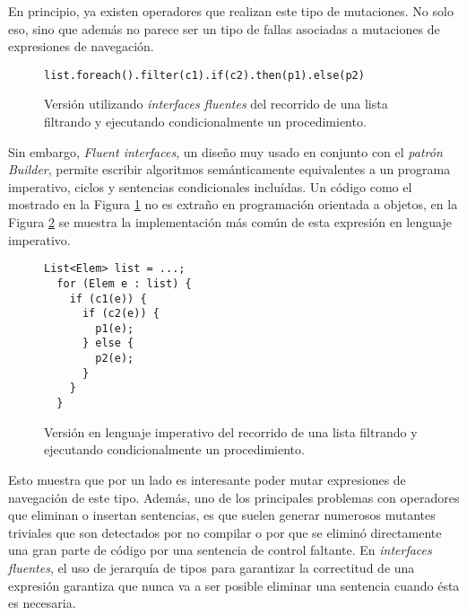 En principio, ya existen operadores que realizan este tipo de mutaciones. No solo eso, sino que adem\'as no parece ser un tipo de fallas asociadas a mutaciones de expresiones de navegaci\'on.

\begin{figure}
	\begin{lstlisting}[frame=single, mathescape=true,framexleftmargin=1.5em]
  list.foreach().filter(c1).if(c2).then(p1).else(p2)
	\end{lstlisting}
	\caption{Versi\'on utilizando \emph{interfaces fluentes} del recorrido de una lista filtrando y ejecutando condicionalmente un procedimiento.}
	\label{figures.examples.fluent.example1.fluent}
\end{figure}

Sin embargo, \emph{Fluent interfaces}, un dise\~no muy usado en conjunto con el \emph{patr\'on Builder}, permite escribir algoritmos sem\'anticamente equivalentes a un programa imperativo, ciclos y sentencias condicionales inclu\'idas. Un c\'odigo como el mostrado en la Figura \ref{figures.examples.fluent.example1.fluent} no es extra\~no en programaci\'on orientada a objetos, en la Figura \ref{figures.examples.fluent.example1.imperative} se muestra la implementaci\'on m\'as com\'un de esta expresi\'on en lenguaje imperativo.

\begin{figure}
	\begin{lstlisting}[frame=single, mathescape=true,framexleftmargin=1.5em]
  List<Elem> list = ...;
  for (Elem e : list) {
    if (c1(e)) {
      if (c2(e)) {
        p1(e);
      } else {
        p2(e);
      }
    }
  }
	\end{lstlisting}
	\caption{Versi\'on en lenguaje imperativo del recorrido de una lista filtrando y ejecutando condicionalmente un procedimiento.}
	\label{figures.examples.fluent.example1.imperative}
\end{figure}

Esto muestra que por un lado es interesante poder mutar expresiones de navegaci\'on de este tipo. Adem\'as, uno de los principales problemas con operadores que eliminan o insertan sentencias, es que suelen generar numerosos mutantes triviales que son detectados por no compilar o por que se elimin\'o directamente una gran parte de c\'odigo por una sentencia de control faltante. En \emph{interfaces fluentes}, el uso de jerarqu\'ia de tipos para garantizar la correctitud de una expresi\'on garantiza que nunca va a ser posible eliminar una sentencia cuando \'esta es necesaria.

